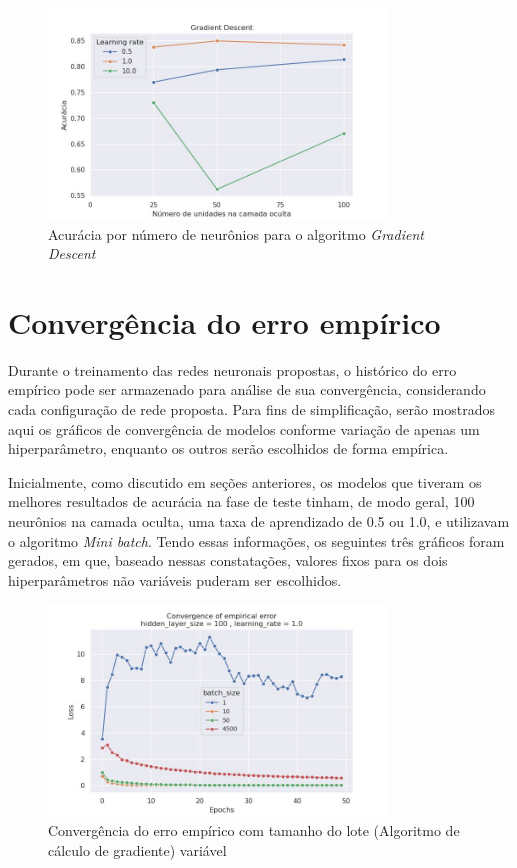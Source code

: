 \documentclass{article}
\begin{document}
\begin{figure}[H]
    \centering
    \includegraphics[width=0.8\textwidth]{images/tradeoff/GD.jpg}
    \caption{Acurácia por número de neurônios para o algoritmo \textit{Gradient Descent}}
\end{figure}


\section{Convergência do erro empírico}

Durante o treinamento das redes neuronais propostas, o histórico do erro empírico pode ser armazenado para análise de sua convergência, considerando cada configuração de rede proposta. Para fins de simplificação, serão mostrados
aqui os gráficos de convergência de modelos conforme variação de apenas um hiperparâmetro, enquanto os outros serão escolhidos de forma empírica.

Inicialmente, como discutido em seções anteriores, os modelos que tiveram os melhores resultados de acurácia na fase de teste tinham, de modo geral, 100 neurônios na camada oculta, uma taxa de aprendizado de 0.5 ou 1.0, e utilizavam o algoritmo \textit{Mini batch}.
Tendo essas informações, os seguintes três gráficos foram gerados, em que, baseado nessas constatações, valores fixos para os dois hiperparâmetros não variáveis puderam ser escolhidos.

\begin{figure}[H]
{\centering
\includegraphics[width=0.8\textwidth]{images/empirical_error/batch_size_not_fixed.jpg}
\caption{Convergência do erro empírico com tamanho do lote (Algoritmo de cálculo de gradiente) variável}}
\end{figure}
\end{document}
